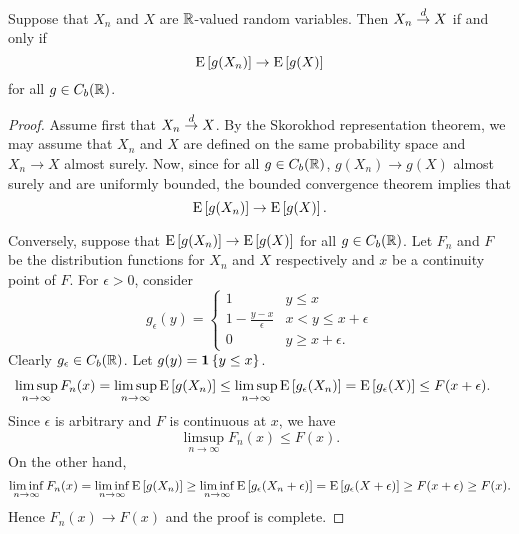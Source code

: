 \begin{theorem}
    Suppose that $X_n$ and $X$ are $\mathbb{R}$-valued random variables. 
    Then $X_n\overset{d}{\to} X$ if and only if 
    \begin{equation*}
        \operatorname{E}\left[ {g(X_n)} \right]\to \operatorname{E}\left[ {g(X)} \right]
    \end{equation*}
    for all $g\in C_b(\mathbb{R})$. 
\end{theorem}
\begin{proof}
    Assume first that $X_n\overset{d}{\to} X$. By the Skorokhod representation 
    theorem, we may assume that $X_n$ and $X$ are defined on 
    the same probability space and $X_n\to X$ almost surely. 
    Now, since for all $g\in C_b(\mathbb{R})$, $g(X_n)\to g(X)$ almost surely 
    and are uniformly bounded, the bounded convergence theorem implies 
    that 
    \begin{equation*}
        \operatorname{E}\left[ {g(X_n)} \right]\to\operatorname{E}\left[ {g(X)} \right]. 
    \end{equation*}

    Conversely, suppose that $\operatorname{E}\left[ {g(X_n)} \right]\to\operatorname{E}\left[ {g(X)} \right]$ 
    for all $g\in C_b(\mathbb{R})$. Let $F_n$ and $F$ be the distribution 
    functions for $X_n$ and $X$ respectively and $x$ be a continuity 
    point of $F$. For $\epsilon>0$, consider 
    \begin{equation*}
        g_\epsilon(y) = \begin{cases}
            1 & y\leq x \\  
            1 - \frac{y-x}{\epsilon} & x < y \leq x+\epsilon \\ 
            0 & y\geq x+\epsilon. 
        \end{cases}
    \end{equation*}
    Clearly $g_\epsilon\in C_b(\mathbb{R})$. Let $g(y) = \mathbf{1}\left\{ {y\leq x} \right\}$. 
    \begin{equation*}
        \begin{split}
            \limsup_{n\to\infty} F_n(x) 
            &= \limsup_{n\to\infty}\operatorname{E}\left[ {g(X_n)} \right] 
            \leq \limsup_{n\to\infty}\operatorname{E}\left[ {g_\epsilon(X_n)} \right] 
            = \operatorname{E}\left[ {g_\epsilon(X)} \right] \leq F(x+\epsilon).
        \end{split} 
    \end{equation*}
    Since $\epsilon$ is arbitrary and $F$ is continuous at $x$, 
    we have 
    \begin{equation*}
        \limsup_{n\to\infty} F_n(x)\leq F(x). 
    \end{equation*}
    On the other hand, 
    \begin{equation*}
        \liminf_{n\to\infty} F_n(x) 
        = \liminf_{n\to\infty} \operatorname{E}\left[ {g(X_n)} \right] 
        \geq \liminf_{n\to\infty} \operatorname{E}\left[ {g_\epsilon(X_n+\epsilon)} \right] 
        = \operatorname{E}\left[ {g_\epsilon(X+\epsilon)} \right] \geq F(x+\epsilon)\geq F(x). 
    \end{equation*}
    Hence $F_n(x)\to F(x)$ and the proof is complete. 
\end{proof}
